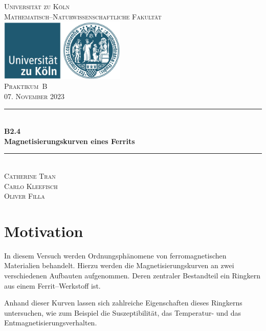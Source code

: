 \documentclass[12pt,a4paper]{scrartcl}
\numberwithin{equation}{section} %
\newcommand{\HRule}{\rule{\linewidth}{0.7mm}}
\begin{document}
\begin{titlepage}
	\pagestyle{empty}

	\begin{center}

	\textsc{\LARGE Universität zu Köln }\\ [0.4cm]
	\textsc{Mathematisch--Naturwissenschaftliche Fakultät} \\[1.5cm]

	\includegraphics[width=0.45\textwidth]{../media/uni}\\[1.5cm]  %

	\textsc{\Large Praktikum~B}\\[2mm]
	\textsc{07. November 2023}\\[10mm]
	\HRule \\[0.4cm]

		{	\Huge \bfseries B2.4}\\[0.4cm]
			{	\huge \bfseries Magnetisierungskurven eines Ferrits}\\[0.3cm]
	
		\HRule \\[3cm]

		\textsc{\Large Catherine Tran } \\[3pt]
		\textsc{\Large Carlo Kleefisch } \\[3pt]
		\textsc{\Large Oliver Filla } \\[3pt]
		
	\end{center}
\end{titlepage}

\newpage
\tableofcontents

\clearpage
\hypertarget{motivation}{%
\section{Motivation}\label{motivation}}
In diesem Versuch werden Ordnungsphänomene von ferromagnetischen Materialien behandelt. Hierzu werden die Magnetisierungskurven an zwei verschiedenen Aufbauten aufgenommen. Deren zentraler Bestandteil ein Ringkern aus einem Ferrit--Werkstoff ist.

Anhand dieser Kurven lassen sich zahlreiche Eigenschaften dieses Ringkerns untersuchen, wie zum Beispiel die Suszeptibilität, das Temperatur- und das Entmagnetisierungsverhalten.
\end{document}
